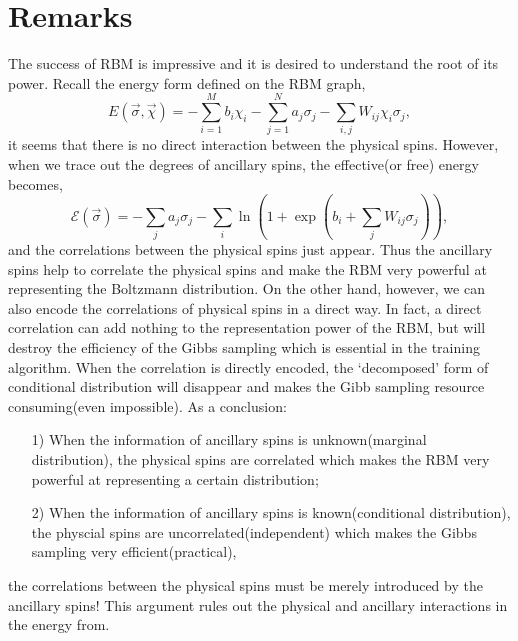 \documentclass[letterpaper, 10pt]{article}
\begin{document}
\section{Remarks}
The success of RBM is impressive and it is desired to understand the root of its power. 
Recall the energy form defined on the RBM graph, 
\[ E(\vec{\sigma},\vec{\chi}) = - \sum_{i=1}^{M} b_i \chi_i - 
\sum_{j=1}^{N} a_j \sigma_j - \sum_{i,j} W_{ij} \chi_i \sigma_j, \]
it seems that there is no direct interaction between the physical spins. 
However, when we trace out the degrees of ancillary spins, the effective(or free) energy becomes,
\[ \mathcal{E}(\vec{\sigma}) = - \sum_{j} a_j \sigma_j - 
\sum_i \ln{( 1 + \exp{( b_i + \sum_j W_{ij} \sigma_j )} )}, \]
and the correlations between the physical spins just appear. 
Thus the ancillary spins help to correlate the physical spins 
and make the RBM very powerful at representing the Boltzmann distribution. 
On the other hand, however, we can also encode the correlations of physical spins in a direct way. 
In fact, a direct correlation can add nothing to the representation power of the RBM, 
but will destroy the efficiency of the Gibbs sampling which is essential in the training algorithm. 
When the correlation is directly encoded, the `decomposed' form of conditional distribution 
will disappear and makes the Gibb sampling resource consuming(even impossible). 
As a conclusion:
\begin{itemize}
	\item[1)]
	When the information of ancillary spins is unknown(marginal distribution), 
	the physical spins are correlated which makes the RBM very powerful 
	at representing a certain distribution;
	\item[2)]
	When the information of ancillary spins is known(conditional distribution),
	the physcial spins are uncorrelated(independent) which makes the Gibbs sampling very efficient(practical),
\end{itemize}
the correlations between the physical spins must be merely introduced by the ancillary spins! This argument rules out 
the physical and ancillary interactions in the energy from.
\end{document}
